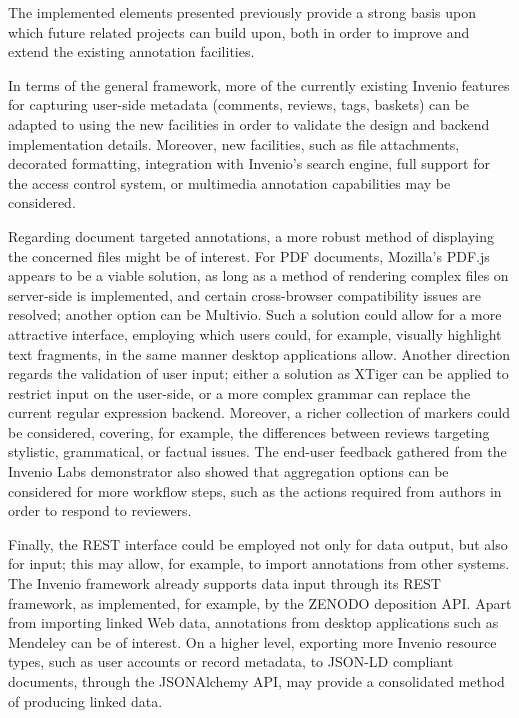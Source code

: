 
The implemented elements presented previously provide a strong basis upon which
future related projects can build upon, both in order to improve and extend the
existing annotation facilities.

In terms of the general framework, more of the currently existing Invenio
features for capturing user-side metadata (comments, reviews, tags, baskets)
can be adapted to using the new facilities in order to validate the design and
backend implementation details. Moreover, new facilities, such as file
attachments, decorated formatting, integration with Invenio's search engine,
full support for the access control system, or multimedia annotation
capabilities may be considered.

Regarding document targeted annotations, a more robust method of displaying the
concerned files might be of interest. For PDF documents, Mozilla's PDF.js
appears to be a viable solution, as long as a method of rendering complex files
on server-side is implemented, and certain cross-browser compatibility issues
are resolved; another option can be Multivio. Such a solution could allow for a
more attractive interface, employing which users could, for example, visually
highlight text fragments, in the same manner desktop applications allow.
Another direction regards the validation of user input; either a solution as
XTiger can be applied to restrict input on the user-side, or a more complex
grammar can replace the current regular expression backend. Moreover, a richer
collection of markers could be considered, covering, for example, the
differences between reviews targeting stylistic, grammatical, or factual
issues. The end-user feedback gathered from the Invenio Labs demonstrator also
showed that aggregation options can be considered for more workflow steps, such
as the actions required from authors in order to respond to reviewers.

Finally, the REST  interface could be employed not only for data output, but
also for input; this may allow, for example, to import annotations from other
systems. The Invenio framework already supports data input through its REST
framework, as implemented, for example, by the ZENODO deposition API. Apart
from importing linked Web data, annotations from desktop applications such as
Mendeley can be of interest. On a higher level, exporting more Invenio resource
types, such as user accounts or record metadata, to JSON-LD compliant documents,
through the JSONAlchemy API, may provide a consolidated method of producing
linked data.
